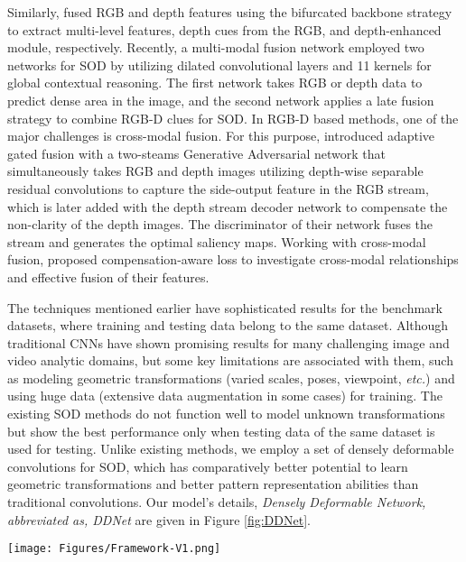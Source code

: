 \documentclass{article}
\newcommand{\latinphrase}[1]{\textit{#1}}
\newcommand{\etc}{\latinphrase{etc.}\xspace}
\begin{document}
Similarly, \cite{fan2020bbs} fused RGB and depth features using the bifurcated backbone strategy to extract multi-level features, depth cues from the RGB, and depth-enhanced module, respectively. Recently, a multi-modal fusion network \cite{chen2019multi} employed two networks for SOD by utilizing dilated convolutional layers and 11 kernels for global contextual reasoning. The first network takes RGB or depth data to predict dense area in the image, and the second network applies a late fusion strategy to combine RGB-D clues for SOD. In RGB-D based methods, one of the major challenges is cross-modal fusion. For this purpose, \cite{liu2020cross} introduced adaptive gated fusion with a two-steams Generative Adversarial network that simultaneously takes RGB and depth images utilizing depth-wise separable residual convolutions to capture the side-output feature in the RGB stream, which is later added with the depth stream decoder network to compensate the non-clarity of the depth images. The discriminator of their network fuses the stream and generates the optimal saliency maps. Working with cross-modal fusion, \cite{zhang2020select} proposed compensation-aware loss to investigate cross-modal relationships and effective fusion of their features.

The techniques mentioned earlier have sophisticated results for the benchmark datasets, where training and testing data belong to the same dataset. Although traditional CNNs have shown promising results for many challenging image and video analytic domains, but some key limitations are associated with them, such as modeling geometric transformations (varied scales, poses, viewpoint, \etc) and using huge data (extensive data augmentation in some cases) for training. The existing SOD methods do not function well to model unknown transformations but show the best performance only when testing data of the same dataset is used for testing. Unlike existing methods, we employ a set of densely deformable convolutions for SOD, which has comparatively better potential to learn geometric transformations and better pattern representation abilities than traditional convolutions. Our model's details, \emph{Densely Deformable Network, abbreviated as, DDNet} are given in Figure \ref{fig:DDNet}.

\begin{figure*}[!h]
    \centering
    \texttt{[image: Figures/Framework-V1.png]}
    \caption{The proposed DDNet for efficient saliency detection that inputs only RGB image and generates its corresponding saliency map with a single color channel.}
    \label{fig:DDNet}
\end{figure*}
\end{document}
